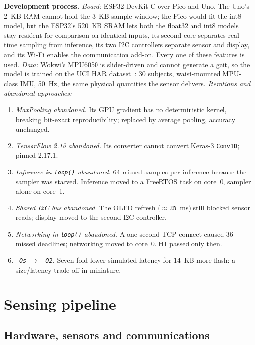 \documentclass[10pt,a4paper]{article}
\begin{document}
\textbf{Development process.} \emph{Board:} ESP32 DevKit-C over Pico and Uno. The Uno's \SI{2}{KB} RAM cannot hold the \SI{3}{KB} sample window; the Pico would fit the int8 model, but the ESP32's \SI{520}{KB} SRAM lets both the float32 and int8 models stay resident for comparison on identical inputs, its second core separates real-time sampling from inference, its two I2C controllers separate sensor and display, and its Wi-Fi enables the communication add-on. Every one of these features is used. \emph{Data:} Wokwi's MPU6050 is slider-driven and cannot generate a gait, so the model is trained on the UCI HAR dataset~\cite{anguita2013}: 30 subjects, waist-mounted MPU-class IMU, \SI{50}{\hertz}, the same physical quantities the sensor delivers. \emph{Iterations and abandoned approaches:}
\begin{enumerate}
  \item \emph{MaxPooling abandoned.} Its GPU gradient has no deterministic kernel, breaking bit-exact reproducibility; replaced by average pooling, accuracy unchanged.
  \item \emph{TensorFlow 2.16 abandoned.} Its converter cannot convert Keras-3 \texttt{Conv1D}; pinned 2.17.1.
  \item \emph{Inference in \texttt{loop()} abandoned.} 64 missed samples per inference because the sampler was starved. Inference moved to a FreeRTOS task on core~0, sampler alone on core~1.
  \item \emph{Shared I2C bus abandoned.} The OLED refresh ($\approx$\SI{25}{ms}) still blocked sensor reads; display moved to the second I2C controller.
  \item \emph{Networking in \texttt{loop()} abandoned.} A one-second TCP connect caused 36 missed deadlines; networking moved to core~0. H1 passed only then.
  \item \emph{\texttt{-Os} $\rightarrow$ \texttt{-O2}.} Seven-fold lower simulated latency for \SI{14}{KB} more flash: a size/latency trade-off in miniature.
\end{enumerate}

\section{Sensing pipeline}

\subsection{Hardware, sensors and communications}
\end{document}
